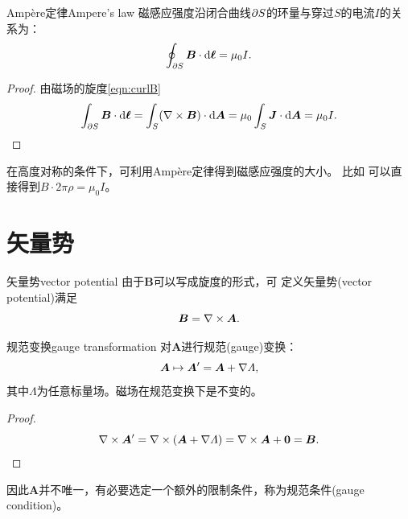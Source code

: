 \begin{theorem}{Ampère定律}{Ampere's law}
    磁感应强度沿闭合曲线$\partial S$的环量与穿过$S$的电流$I$的关系为：
    \begin{equation}
        \label{eqn:Ampere}
        \oint_{\partial S}\bm B \cdot \mathop{}\!\mathrm{d}\bm\ell = \mu_0I.
    \end{equation}
\end{theorem}

\begin{proof}
    由磁场的旋度\eqref{eqn:curlB}
    \[
        \int_{\partial S}\bm B \cdot \mathop{}\!\mathrm{d}\bm\ell = \int_S(\nabla\times\bm B) \cdot \mathop{}\!\mathrm{d}\bm A = \mu_0\int_S\bm J \cdot \mathop{}\!\mathrm{d}\bm A = \mu_0I.
        \qedhere
    \]
\end{proof}

\begin{remark}
    在高度对称的条件下，可利用Ampère定律得到磁感应强度的大小。
    比如 可以直接得到$B \cdot 2\pi\rho = \mu_0I$。
\end{remark}

\section{矢量势}
\label{sec:vector potential}

\begin{definition}{矢量势}{vector potential}
    由于$\bm B$可以写成旋度的形式，可
    定义矢量势(vector potential)满足
    \begin{equation}
        \label{eqn:B=curlA}
        \bm B = \nabla\times\bm A.
    \end{equation}
\end{definition}

\begin{theorem}
    {规范变换}{gauge transformation}
    对$\bm A$进行规范(gauge)变换：
    \begin{equation}
        \label{eq:ed-magnetostatic-gauge-transformation}
        \bm A \mapsto \bm A' = \bm A + \nabla\varLambda,
    \end{equation}
    其中$\varLambda$为任意标量场。磁场在规范变换下是不变的。
\end{theorem}

\begin{proof}
    \[
        \nabla\times\bm A' = \nabla\times(\bm A + \nabla\varLambda) = \nabla\times\bm A + \bm 0 = \bm B.
        \qedhere    
    \]
\end{proof}

\begin{corollary}
    因此$\bm A$并不唯一，有必要选定一个额外的限制条件，称为规范条件(gauge condition)。
\end{corollary}

